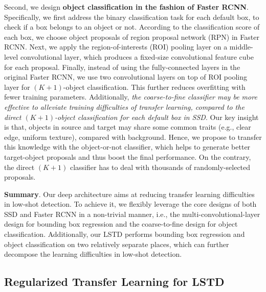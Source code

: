\documentclass[letterpaper]{article} \usepackage{aaai18}  \usepackage{times}  \usepackage{helvet}  \usepackage{courier}  \usepackage{url}  \usepackage{graphicx}
\begin{document}
Second,
we design \textbf{object classification in the fashion of Faster RCNN}.
Specifically,
we first address the binary classification task for each default box,
to check if a box belongs to an object or not.
According to the classification score of each box,
we choose object proposals of region proposal network (RPN) in Faster RCNN.
Next,
we apply the region-of-interests (ROI) pooling layer on a middle-level convolutional layer,
which produces a fixed-size convolutional feature cube for each proposal.
Finally,
instead of using the fully-connected layers in the original Faster RCNN,
we use two convolutional layers on top of ROI pooling layer for $(K+1)$-object classification.
This further reduces overfitting with fewer training parameters.
Additionally,
\textit{the coarse-to-fine classifier may be more effective to alleviate training difficulties of transfer learning,
compared to the direct $(K+1)$-object classification for each default box in SSD}.
Our key insight is that,
objects in source and target may share some common traits (e.g., clear edge, uniform texture),
compared with background.
Hence,
we propose to transfer this knowledge with the object-or-not classifier,
which helps to generate better target-object proposals and thus boost the final performance.
On the contrary,
the direct $(K+1)$ classifier has to deal with thousands of randomly-selected proposals.







\textbf{Summary}.
Our deep architecture aims at reducing transfer learning difficulties in low-shot detection.
To achieve it,
we flexibly leverage the core designs of both SSD and Faster RCNN in a non-trivial manner,
i.e.,
the multi-convolutional-layer design for bounding box regression and the coarse-to-fine design for object classification.
Additionally,
our LSTD performs bounding box regression and object classification on two relatively separate places,
which can further decompose the learning difficulties in low-shot detection.






\subsection{Regularized Transfer Learning for LSTD}
\label{Transfer Learning with Low-Shot Detection Regularization}
\end{document}
